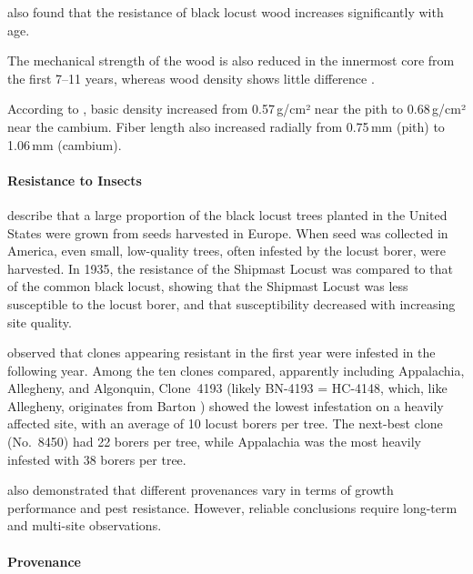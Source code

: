 \citet{szczepkowski2025robinePilze} also found that the resistance of black locust wood increases significantly with age.

The mechanical strength of the wood is also reduced in the innermost core from the first 7–11 years, whereas wood density shows little difference \citep{adamopoulos2007jungesUndAltesRobinienholz,bijak2021robinienholz}.

According to \citet{stringer1987robinieHolzdichte}, basic density increased from 0.57\,g/cm² near the pith to 0.68\,g/cm² near the cambium. Fiber length also increased radially from 0.75\,mm (pith) to 1.06\,mm (cambium).

\paragraph{Resistance to Insects}

\citet{hall1937robinie,cummings1947robinie} describe that a large proportion of the black locust trees planted in the United States were grown from seeds harvested in Europe. When seed was collected in America, even small, low-quality trees, often infested by the locust borer, were harvested. In 1935, the resistance of the Shipmast Locust was compared to that of the common black locust, showing that the Shipmast Locust was less susceptible to the locust borer, and that susceptibility decreased with increasing site quality.

\citet{wollerman1968robinieBorer} observed that clones appearing resistant in the first year were infested in the following year. Among the ten clones compared, apparently including Appalachia, Allegheny, and Algonquin, Clone~4193 (likely BN-4193 = HC-4148, which, like Allegheny, originates from Barton \citep{santamour1960robinie,steinergroup1987robinie}) showed the lowest infestation on a heavily affected site, with an average of 10 locust borers per tree. The next-best clone (No.~8450) had 22 borers per tree, while Appalachia was the most heavily infested with 38 borers per tree.

\citet{genys1990robinie,bridgen1988robinie,mebrahtu1989robinie} also demonstrated that different provenances vary in terms of growth performance and pest resistance. However, reliable conclusions require long-term and multi-site observations.

\paragraph{Provenance}

